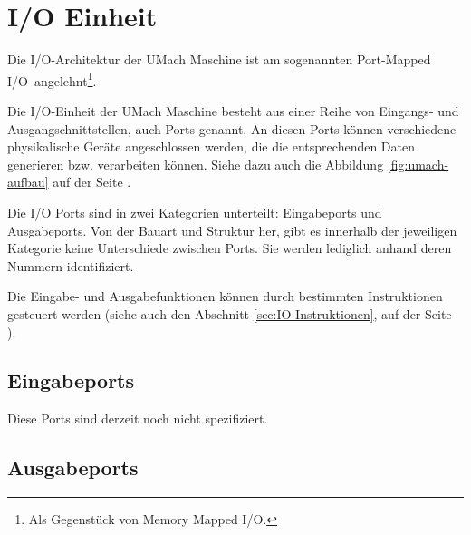 \section{I/O Einheit}
\label{sec:IO-Einheit}

Die I/O-Architektur der UMach Maschine ist am sogenannten \glqq Port-Mapped
I/O\grqq\ angelehnt\footnote{Als Gegenstück von \glqq Memory Mapped I/O\grqq.}.


Die I/O-Einheit der UMach Maschine besteht aus einer Reihe von Eingangs- und
Ausgangschnittstellen, auch Ports genannt. An
diesen Ports können verschiedene physikalische Geräte angeschlossen werden, die
die entsprechenden Daten generieren bzw. verarbeiten können. Siehe dazu auch die
Abbildung \ref{fig:umach-aufbau} auf der Seite \pageref{fig:umach-aufbau}.

Die I/O Ports sind in zwei Kategorien unterteilt: Eingabeports und
Ausgabeports. Von der Bauart und Struktur her, gibt es innerhalb der jeweiligen
Kategorie keine Unterschiede zwischen Ports. Sie werden lediglich anhand deren
Nummern identifiziert.

Die Eingabe- und Ausgabefunktionen können durch bestimmten Instruktionen
gesteuert werden (siehe auch den Abschnitt \ref{sec:IO-Instruktionen}, auf der
Seite \pageref{sec:IO-Instruktionen}).


\subsection{Eingabeports}

Diese Ports sind derzeit noch nicht spezifiziert.



\subsection{Ausgabeports}













